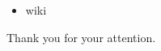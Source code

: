 
\begin{frame}{}
  \begin{block}{}
    \begin{itemize}
      \item wiki
    \end{itemize}
  \end{block}

  \begin{block}{}
    Thank you for your attention. 
  \end{block}
\end{frame}

